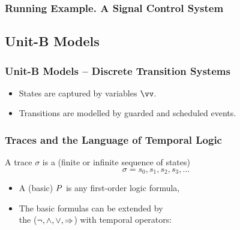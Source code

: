\begin{frame}
  \frametitle{Running Example. A Signal Control System}

  \begin{center}
    
  \end{center}
  
  \begin{requirements}
    \ReqSpacing
  \end{requirements}
  
\end{frame}

\subsection{Unit-B Models}
\label{sec:unit-b-models}

\begin{frame}
  \frametitle{Unit-B Models -- Discrete Transition Systems}

  \begin{itemize}
  \item States are captured by \alert{variables $\vv$}.
    \medskip
  \item Transitions are modelled by \alert{guarded and scheduled events}.
  \end{itemize}

\end{frame}

\begin{frame}
  \frametitle{Traces and the Language of Temporal Logic}

  \begin{alertblock}{}
    A trace $\sigma$ is a (finite or infinite sequence of states)
    \[\sigma = s_0, s_1, s_2, s_3, \ldots\]
  \end{alertblock}

  \begin{itemize}
  \item A (basic)  $P$ is any
    \alert{first-order logic formula},
    \medskip
  \item The basic formulas can be extended by  \\
    \quad the  ($\neg, \land, \lor, \mathbin\Rightarrow$) with
    \alert{temporal operators}:
    \medskip
    \begin{center}
      
    \end{center}
    \begin{center}
      
    \end{center}
  \end{itemize}
\end{frame}


